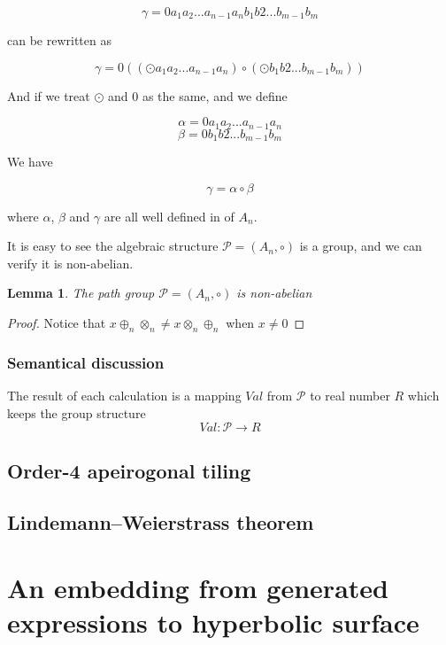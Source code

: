 \documentclass{article}
\newtheorem{lemma}{Lemma}
\begin{document}
$$\gamma = 0 a_1 a_2 ... a_{n-1} a_n b_1 b2 ... b_{m-1} b_m$$

can be rewritten as

$$\gamma = 0 ((\odot a_1 a_2 ... a_{n-1} a_n) \circ (\odot b_1 b2 ... b_{m-1} b_m))$$

And if we treat $\odot$ and $0$ as the same, and we define

$$\alpha = 0 a_1 a_2 ... a_{n-1} a_n$$
$$\beta = 0 b_1 b2 ... b_{m-1} b_m$$

We have

$$\gamma = \alpha \circ \beta$$

where $\alpha$, $\beta$ and $\gamma$ are all well defined in of $A_n$.

It is easy to see the algebraic structure $\mathcal{P} = (A_n, \circ)$ is a group, and we can verify it is non-abelian.

\begin{lemma}
\label{lemma:nonabelian}
The path group $\mathcal{P} = (A_n, \circ)$ is non-abelian
\end{lemma}

\begin{proof}
Notice that $x \oplus_n \otimes_n \neq x \otimes_n \oplus_n$ when $x \neq 0$
\qedhere
\end{proof}

\subsubsection{Semantical discussion}\label{sec:semantical}

The result of each calculation is a mapping $Val$ from $\mathcal{P}$ to real number $R$ which keeps the group structure
$$ Val: \mathcal{P} \to R $$

\subsection{Order-4 apeirogonal tiling}\label{sec:o4tiling}

\subsection{Lindemann–Weierstrass theorem}\label{sec:lindemann}

\section{An embedding from generated expressions to hyperbolic surface}\label{sec:embeding}
\end{document}
